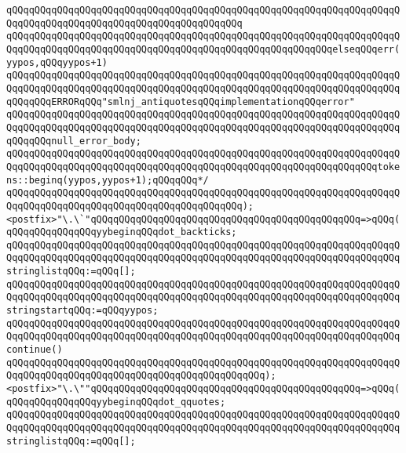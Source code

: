 \verb|qQQqqQQqqQQqqQQqqQQqqQQqqQQqqQQqqQQqqQQqqQQqqQQqqQQqqQQqqQQqqQQqqQQqqQQqqQQqqQQqqQQqqQQqqQQqqQQqqQQqqQQqqQQqqQQq|\newline
\verb|qQQqqQQqqQQqqQQqqQQqqQQqqQQqqQQqqQQqqQQqqQQqqQQqqQQqqQQqqQQqqQQqqQQqqQQqqQQqqQQqqQQqqQQqqQQqqQQqqQQqqQQqqQQqqQQqqQQqqQQqqQQqqQQqelseqQQqerr(yypos,qQQqyypos+1)|\newline
\verb|qQQqqQQqqQQqqQQqqQQqqQQqqQQqqQQqqQQqqQQqqQQqqQQqqQQqqQQqqQQqqQQqqQQqqQQqqQQqqQQqqQQqqQQqqQQqqQQqqQQqqQQqqQQqqQQqqQQqqQQqqQQqqQQqqQQqqQQqqQQqqQQqqQQqERRORqQQq"smlnj_antiquotesqQQqimplementationqQQqerror"|\newline
\verb|qQQqqQQqqQQqqQQqqQQqqQQqqQQqqQQqqQQqqQQqqQQqqQQqqQQqqQQqqQQqqQQqqQQqqQQqqQQqqQQqqQQqqQQqqQQqqQQqqQQqqQQqqQQqqQQqqQQqqQQqqQQqqQQqqQQqqQQqqQQqqQQqqQQqnull_error_body;|\newline
\verb|qQQqqQQqqQQqqQQqqQQqqQQqqQQqqQQqqQQqqQQqqQQqqQQqqQQqqQQqqQQqqQQqqQQqqQQqqQQqqQQqqQQqqQQqqQQqqQQqqQQqqQQqqQQqqQQqqQQqqQQqqQQqqQQqqQQqqQQqtokens::beginq(yypos,yypos+1);qQQqqQQq*/|\newline
\verb|qQQqqQQqqQQqqQQqqQQqqQQqqQQqqQQqqQQqqQQqqQQqqQQqqQQqqQQqqQQqqQQqqQQqqQQqqQQqqQQqqQQqqQQqqQQqqQQqqQQqqQQqqQQqqQQq);|\newline
\newline
\verb|<postfix>"\.\`"qQQqqQQqqQQqqQQqqQQqqQQqqQQqqQQqqQQqqQQqqQQqqQQq=>qQQq(qQQqqQQqqQQqqQQqyybeginqQQqdot_backticks;|\newline
\verb|qQQqqQQqqQQqqQQqqQQqqQQqqQQqqQQqqQQqqQQqqQQqqQQqqQQqqQQqqQQqqQQqqQQqqQQqqQQqqQQqqQQqqQQqqQQqqQQqqQQqqQQqqQQqqQQqqQQqqQQqqQQqqQQqqQQqqQQqqQQqstringlistqQQq:=qQQq[];|\newline
\verb|qQQqqQQqqQQqqQQqqQQqqQQqqQQqqQQqqQQqqQQqqQQqqQQqqQQqqQQqqQQqqQQqqQQqqQQqqQQqqQQqqQQqqQQqqQQqqQQqqQQqqQQqqQQqqQQqqQQqqQQqqQQqqQQqqQQqqQQqqQQqstringstartqQQq:=qQQqyypos;|\newline
\verb|qQQqqQQqqQQqqQQqqQQqqQQqqQQqqQQqqQQqqQQqqQQqqQQqqQQqqQQqqQQqqQQqqQQqqQQqqQQqqQQqqQQqqQQqqQQqqQQqqQQqqQQqqQQqqQQqqQQqqQQqqQQqqQQqqQQqqQQqqQQqcontinue()|\newline
\verb|qQQqqQQqqQQqqQQqqQQqqQQqqQQqqQQqqQQqqQQqqQQqqQQqqQQqqQQqqQQqqQQqqQQqqQQqqQQqqQQqqQQqqQQqqQQqqQQqqQQqqQQqqQQqqQQqqQQq);|\newline
\newline
\verb|<postfix>"\.\""qQQqqQQqqQQqqQQqqQQqqQQqqQQqqQQqqQQqqQQqqQQqqQQq=>qQQq(qQQqqQQqqQQqqQQqyybeginqQQqdot_qquotes;|\newline
\verb|qQQqqQQqqQQqqQQqqQQqqQQqqQQqqQQqqQQqqQQqqQQqqQQqqQQqqQQqqQQqqQQqqQQqqQQqqQQqqQQqqQQqqQQqqQQqqQQqqQQqqQQqqQQqqQQqqQQqqQQqqQQqqQQqqQQqqQQqqQQqstringlistqQQq:=qQQq[];|\newline
